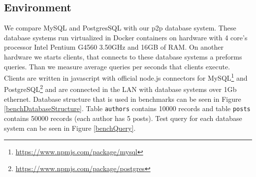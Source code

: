 \subsection{Environment}
We compare MySQL and PostgresSQL with our p2p database system. These database systems run virtualized in Docker containers on hardware with 4 core's processor Intel Pentium G4560 3.50GHz and 16GB of RAM. On another hardware we starts clients, that connects to these database systems a preforms queries. Than we measure average queries per seconds that clients execute. Clients are written in javascript with official node.js connectors for MySQL\footnote{\url{https://www.npmjs.com/package/mysql}} and PostgreSQL\footnote{\url{https://www.npmjs.com/package/postgres}} and are connected in the LAN with database systems over 1Gb ethernet. Database structure that is used in benchmarks can be seen in Figure \ref{benchDatabaseStructure}. Table \texttt{authors} contains 10000 records and table \texttt{posts} contains 50000 records (each author has 5 posts). Test query for each database system can be seen in Figure \ref{benchQuery}.

